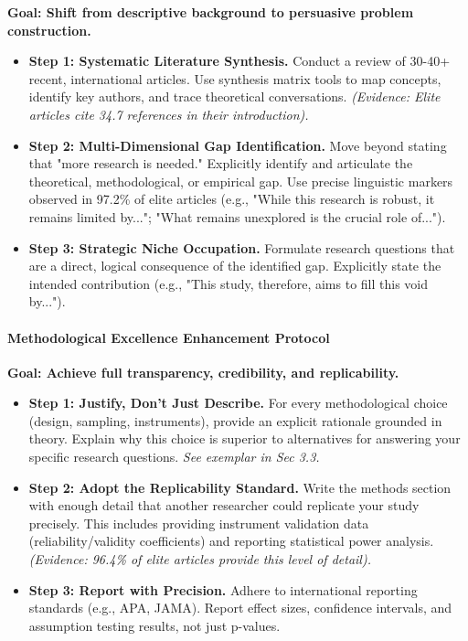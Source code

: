 \documentclass[journal,article,submit,pdftex,moreauthors]{Definitions/mdpi}
\begin{document}
\textbf{Goal: Shift from descriptive background to persuasive problem construction.}
\begin{itemize}
\item \textbf{Step 1: Systematic Literature Synthesis.} Conduct a review of 30-40+ recent, international articles. Use synthesis matrix tools to map concepts, identify key authors, and trace theoretical conversations. \textit{(Evidence: Elite articles cite 34.7 references in their introduction).}
\item \textbf{Step 2: Multi-Dimensional Gap Identification.} Move beyond stating that "more research is needed." Explicitly identify and articulate the theoretical, methodological, or empirical gap. Use precise linguistic markers observed in 97.2\% of elite articles (e.g., "While this research is robust, it remains limited by..."; "What remains unexplored is the crucial role of...").
\item \textbf{Step 3: Strategic Niche Occupation.} Formulate research questions that are a direct, logical consequence of the identified gap. Explicitly state the intended contribution (e.g., "This study, therefore, aims to fill this void by...").
\end{itemize}

\paragraph{Methodological Excellence Enhancement Protocol}

\textbf{Goal: Achieve full transparency, credibility, and replicability.}
\begin{itemize}
\item \textbf{Step 1: Justify, Don't Just Describe.} For every methodological choice (design, sampling, instruments), provide an explicit rationale grounded in theory. Explain why this choice is superior to alternatives for answering your specific research questions. \textit{See exemplar in Sec 3.3.}
\item \textbf{Step 2: Adopt the Replicability Standard.} Write the methods section with enough detail that another researcher could replicate your study precisely. This includes providing instrument validation data (reliability/validity coefficients) and reporting statistical power analysis. \textit{(Evidence: 96.4\% of elite articles provide this level of detail).}
\item \textbf{Step 3: Report with Precision.} Adhere to international reporting standards (e.g., APA, JAMA). Report effect sizes, confidence intervals, and assumption testing results, not just p-values.
\end{itemize}
\end{document}
